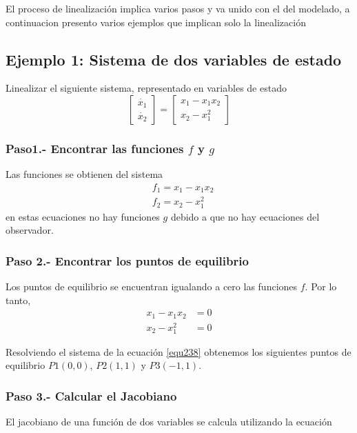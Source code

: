 \documentclass[12pt]{book}
\theoremstyle{definition}
\theoremstyle{remark}
\theoremstyle{plain}
\begin{document}
El proceso de linealización implica varios pasos y va unido con el del modelado, a continuacion presento varios ejemplos que implican solo la linealización

\subsection{Ejemplo 1: Sistema de dos variables de estado}
Linealizar el siguiente sistema, representado en variables de estado
\begin{equation}
\label{equ236}
\begin{bmatrix}
\dot{x_1}\\
\dot{x_2}
\end{bmatrix}
=
\begin{bmatrix}
x_1 - x_1 x_2\\
x_2 - x_1^2
\end{bmatrix}
\end{equation}

\subsubsection{Paso1.- Encontrar las funciones $f$ y $g$}
Las funciones se obtienen del sistema 
\begin{equation}
\label{equ237}
\begin{aligned}
& f_1 = x_1 - x_1 x_2\\
& f_2 = x_2 - x_1^2
\end{aligned}
\end{equation}
en estas ecuaciones no hay funciones $g$ debido a que no hay ecuaciones del observador.

\subsubsection{Paso 2.- Encontrar los puntos de equilibrio}
Los puntos de equilibrio se encuentran igualando a cero las funciones $f$. Por lo tanto, 
\begin{equation}
\label{equ238}
\begin{aligned}
 x_1 - x_1 x_2 &=0\\
x_2 - x_1^2 &=0
\end{aligned}
\end{equation}

Resolviendo el sistema de la ecuación \ref{equ238} obtenemos los siguientes puntos de equilibrio
$P1(0,0)$, $P2(1,1)$ y $P3(-1,1)$.

\subsubsection{Paso 3.- Calcular el Jacobiano}
El jacobiano de una función de dos variables se calcula utilizando la ecuación 
\end{document}

